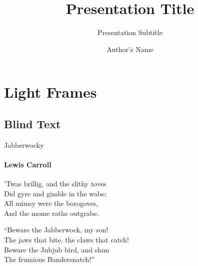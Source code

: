 \documentclass{beamer}
\title{Presentation Title} %
\subtitle{Presentation Subtitle} %
\author{Author's Name}
\begin{document}
  \frame[c]{\maketitle}


    \section{Light Frames}
    \subsection{Blind Text}
    \begin{frame}{Jabberwocky}
      \framesubtitle{Lewis Carroll}%
      'Twas brillig, and the slithy toves\\
      Did gyre and gimble in the wabe;\\
      All mimsy were the borogoves,\\
      And the mome raths outgrabe.\\\bigskip

      “Beware the Jabberwock, my son!\\
      The jaws that bite, the claws that catch!\\
      Beware the Jubjub bird, and shun\\
      The frumious Bandersnatch!”\\
    \end{frame}
\end{document}
